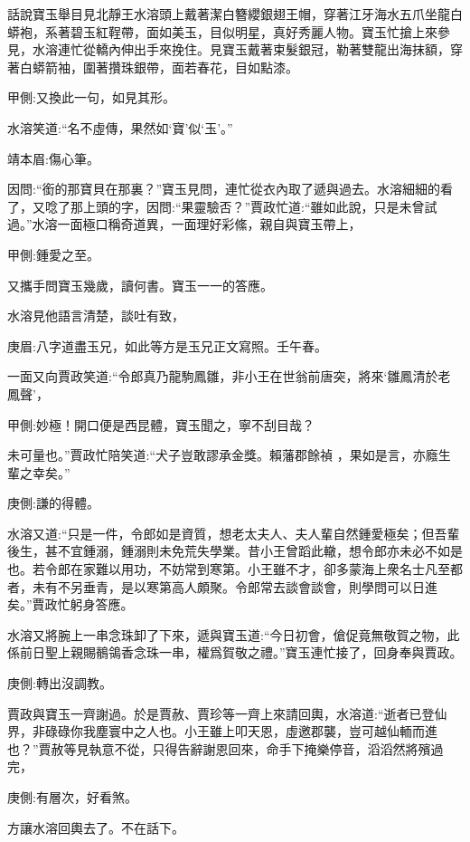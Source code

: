 \begin{parag}
    話說寶玉舉目見北靜王水溶頭上戴著潔白簪纓銀翅王帽，穿著江牙海水五爪坐龍白蟒袍，系著碧玉紅鞓帶，面如美玉，目似明星，真好秀麗人物。寶玉忙搶上來參見，水溶連忙從轎內伸出手來挽住。見寶玉戴著束髮銀冠，勒著雙龍出海抹額，穿著白蟒箭袖，圍著攢珠銀帶，面若春花，目如點漆。\begin{note}甲側:又換此一句，如見其形。\end{note}水溶笑道:“名不虛傳，果然如‘寶’似‘玉’。”\begin{note}靖本眉:傷心筆。\end{note}因問:“銜的那寶貝在那裏？”寶玉見問，連忙從衣內取了遞與過去。水溶細細的看了，又唸了那上頭的字，因問:“果靈驗否？”賈政忙道:“雖如此說，只是未曾試過。”水溶一面極口稱奇道異，一面理好彩絛，親自與寶玉帶上，\begin{note}甲側:鍾愛之至。\end{note}又攜手問寶玉幾歲，讀何書。寶玉一一的答應。
\end{parag}


\begin{parag}
    水溶見他語言清楚，談吐有致，\begin{note}庚眉:八字道盡玉兄，如此等方是玉兄正文寫照。壬午春。\end{note}一面又向賈政笑道:“令郎真乃龍駒鳳雛，非小王在世翁前唐突，將來‘雛鳳清於老鳳聲’，\begin{note}甲側:妙極！開口便是西昆體，寶玉聞之，寧不刮目哉？\end{note}未可量也。”賈政忙陪笑道:“犬子豈敢謬承金獎。賴藩郡餘禎 ，果如是言，亦廕生輩之幸矣。”\begin{note}庚側:謙的得體。\end{note}水溶又道:“只是一件，令郎如是資質，想老太夫人、夫人輩自然鍾愛極矣；但吾輩後生，甚不宜鍾溺，鍾溺則未免荒失學業。昔小王曾蹈此轍，想令郎亦未必不如是也。若令郎在家難以用功，不妨常到寒第。小王雖不才，卻多蒙海上衆名士凡至都者，未有不另垂青，是以寒第高人頗聚。令郎常去談會談會，則學問可以日進矣。”賈政忙躬身答應。
\end{parag}


\begin{parag}
    水溶又將腕上一串念珠卸了下來，遞與寶玉道:“今日初會，傖促竟無敬賀之物，此係前日聖上親賜鶺鴒香念珠一串，權爲賀敬之禮。”寶玉連忙接了，回身奉與賈政。\begin{note}庚側:轉出沒調教。\end{note}賈政與寶玉一齊謝過。於是賈赦、賈珍等一齊上來請回輿，水溶道:“逝者已登仙界，非碌碌你我塵寰中之人也。小王雖上叩天恩，虛邀郡襲，豈可越仙輀而進也？”賈赦等見執意不從，只得告辭謝恩回來，命手下掩樂停音，滔滔然將殯過完，\begin{note}庚側:有層次，好看煞。\end{note}方讓水溶回輿去了。不在話下。
\end{parag}


